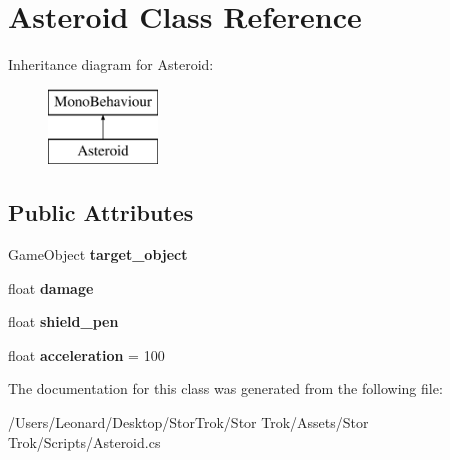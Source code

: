 \hypertarget{class_asteroid}{}\section{Asteroid Class Reference}
\label{class_asteroid}
Inheritance diagram for Asteroid\+:\begin{figure}[H]
\begin{center}
\leavevmode
\includegraphics[height=2.000000cm]{class_asteroid}
\end{center}
\end{figure}
\subsection*{Public Attributes}
\begin{DoxyCompactItemize}
\item 
\mbox{\label{class_asteroid_a10ff7dab44740dd98ed44ec9f6386021}} 
Game\+Object {\bfseries target\+\_\+object}
\item 
\mbox{\label{class_asteroid_a72a8b00fa29cafb864297764b594fa08}} 
float {\bfseries damage}
\item 
\mbox{\label{class_asteroid_a2113dbc14a1bb6298100b979de52f68d}} 
float {\bfseries shield\+\_\+pen}
\item 
\mbox{\label{class_asteroid_aa57424523dd19579e82ae7aed657be95}} 
float {\bfseries acceleration} = 100
\end{DoxyCompactItemize}


The documentation for this class was generated from the following file\+:\begin{DoxyCompactItemize}
\item 
/\+Users/\+Leonard/\+Desktop/\+Stor\+Trok/\+Stor Trok/\+Assets/\+Stor Trok/\+Scripts/Asteroid.\+cs\end{DoxyCompactItemize}
